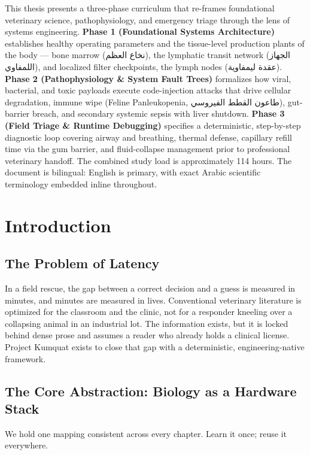 \documentclass[12pt,oneside]{book}
\newcommand{\ar}[1]{\textarabic{#1}}
\begin{document}
This thesis presents a three-phase curriculum that re-frames foundational
veterinary science, pathophysiology, and emergency triage through the
lens of systems engineering. \textbf{Phase 1 (Foundational Systems
Architecture)} establishes healthy operating parameters and the
tissue-level production plants of the body --- bone marrow
(\ar{نخاع العظم}), the lymphatic transit network
(\ar{الجهاز اللمفاوي}), and localized filter checkpoints, the lymph nodes
(\ar{عقدة ليمفاوية}). \textbf{Phase 2 (Pathophysiology \& System Fault
Trees)} formalizes how viral, bacterial, and toxic payloads execute
code-injection attacks that drive cellular degradation, immune wipe
(Feline Panleukopenia, \ar{طاعون القطط الفيروسي}), gut-barrier breach,
and secondary systemic sepsis with liver shutdown. \textbf{Phase 3 (Field
Triage \& Runtime Debugging)} specifies a deterministic, step-by-step
diagnostic loop covering airway and breathing, thermal defense, capillary
refill time via the gum barrier, and fluid-collapse management prior to
professional veterinary handoff. The combined study load is approximately
114 hours. The document is bilingual: English is primary, with exact
Arabic scientific terminology embedded inline throughout.

\tableofcontents

\mainmatter

\chapter{Introduction}

\section{The Problem of Latency}
In a field rescue, the gap between a correct decision and a guess is
measured in minutes, and minutes are measured in lives. Conventional
veterinary literature is optimized for the classroom and the clinic, not
for a responder kneeling over a collapsing animal in an industrial lot.
The information exists, but it is locked behind dense prose and assumes a
reader who already holds a clinical license. Project Kumquat exists to
close that gap with a deterministic, engineering-native framework.

\section{The Core Abstraction: Biology as a Hardware Stack}
We hold one mapping consistent across every chapter. Learn it once; reuse
it everywhere.
\end{document}
